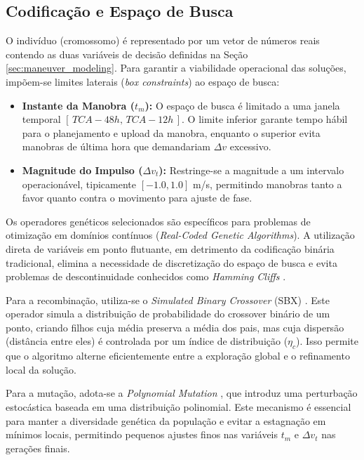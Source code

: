 \subsection{Codificação e Espaço de Busca}

O indivíduo (cromossomo) é representado por um vetor de números reais contendo as duas variáveis de decisão definidas na Seção \ref{sec:maneuver_modeling}. Para garantir a viabilidade operacional das soluções, impõem-se limites laterais (\textit{box constraints}) ao espaço de busca:

\begin{itemize}
    \item \textbf{Instante da Manobra ($t_m$):} O espaço de busca é limitado a uma janela temporal $[\, TCA - 48h, \, TCA - 12h \,]$. O limite inferior garante tempo hábil para o planejamento e upload da manobra, enquanto o superior evita manobras de última hora que demandariam $\Delta v$ excessivo.
    \item \textbf{Magnitude do Impulso ($\Delta v_t$):} Restringe-se a magnitude a um intervalo operacionável, tipicamente $[-1.0, 1.0]$ m/s, permitindo manobras tanto a favor quanto contra o movimento para ajuste de fase.
\end{itemize}

Os operadores genéticos selecionados são específicos para problemas de otimização em domínios contínuos (\textit{Real-Coded Genetic Algorithms}). A utilização direta de variáveis em ponto flutuante, em detrimento da codificação binária tradicional, elimina a necessidade de discretização do espaço de busca e evita problemas de descontinuidade conhecidos como \textit{Hamming Cliffs} \cite{Deb2001}.

Para a recombinação, utiliza-se o \textit{Simulated Binary Crossover} (SBX) \cite{Deb1995}. Este operador simula a distribuição de probabilidade do crossover binário de um ponto, criando filhos cuja média preserva a média dos pais, mas cuja dispersão (distância entre eles) é controlada por um índice de distribuição ($\eta_c$). Isso permite que o algoritmo alterne eficientemente entre a exploração global e o refinamento local da solução.

Para a mutação, adota-se a \textit{Polynomial Mutation} \cite{Deb1996}, que introduz uma perturbação estocástica baseada em uma distribuição polinomial. Este mecanismo é essencial para manter a diversidade genética da população e evitar a estagnação em mínimos locais, permitindo pequenos ajustes finos nas variáveis $t_m$ e $\Delta v_t$ nas gerações finais.

